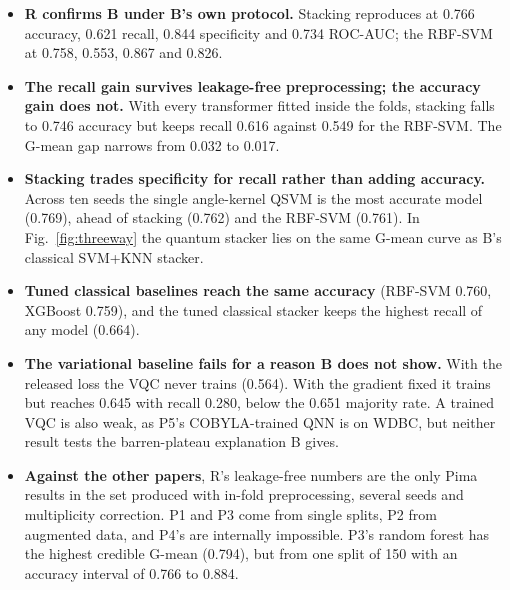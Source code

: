 \documentclass[11pt,a4paper]{article}
\begin{document}
\begin{itemize}
  \item \textbf{R confirms B under B's own protocol.} Stacking reproduces at 0.766 accuracy, 0.621 recall, 0.844 specificity and 0.734 ROC-AUC; the RBF-SVM at 0.758, 0.553, 0.867 and 0.826.
  \item \textbf{The recall gain survives leakage-free preprocessing; the accuracy gain does not.} With every transformer fitted inside the folds, stacking falls to 0.746 accuracy but keeps recall 0.616 against 0.549 for the RBF-SVM. The G-mean gap narrows from 0.032 to 0.017.
  \item \textbf{Stacking trades specificity for recall rather than adding accuracy.} Across ten seeds the single angle-kernel QSVM is the most accurate model (0.769), ahead of stacking (0.762) and the RBF-SVM (0.761). In Fig.~\ref{fig:threeway} the quantum stacker lies on the same G-mean curve as B's classical SVM+KNN stacker.
  \item \textbf{Tuned classical baselines reach the same accuracy} (RBF-SVM 0.760, XGBoost 0.759), and the tuned classical stacker keeps the highest recall of any model (0.664).
  \item \textbf{The variational baseline fails for a reason B does not show.} With the released loss the VQC never trains (0.564). With the gradient fixed it trains but reaches 0.645 with recall 0.280, below the 0.651 majority rate. A trained VQC is also weak, as P5's COBYLA-trained QNN is on WDBC, but neither result tests the barren-plateau explanation B gives.
  \item \textbf{Against the other papers}, R's leakage-free numbers are the only Pima results in the set produced with in-fold preprocessing, several seeds and multiplicity correction. P1 and P3 come from single splits, P2 from augmented data, and P4's are internally impossible. P3's random forest has the highest credible G-mean (0.794), but from one split of 150 with an accuracy interval of 0.766 to 0.884.
\end{itemize}
\end{document}

